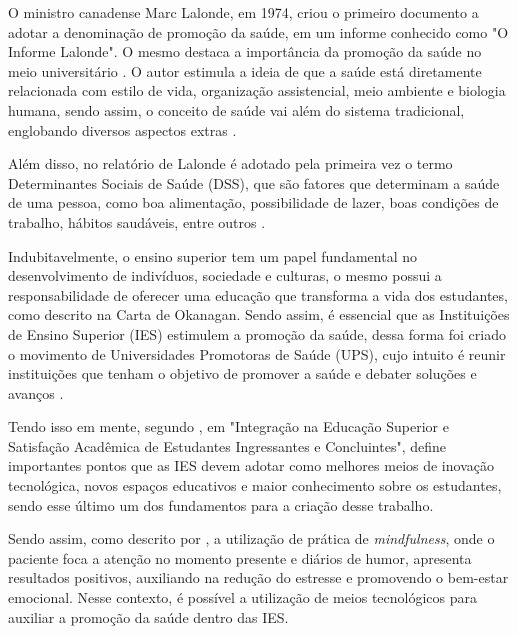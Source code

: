 
O ministro canadense Marc Lalonde, em 1974, criou o primeiro documento a adotar a denominação de promoção da saúde, em um informe conhecido como "O Informe Lalonde". O mesmo destaca a importância da promoção da saúde no meio universitário \cite{rebraups2022}. O autor estimula a ideia de que a saúde está diretamente relacionada com estilo de vida, organização assistencial, meio ambiente e biologia humana, sendo assim, o conceito de saúde vai além do sistema tradicional, englobando diversos aspectos extras \cite{rezende_promocao_2022}.

Além disso, no relatório de Lalonde é adotado pela primeira vez o termo Determinantes Sociais de Saúde (DSS), que são fatores que determinam a saúde de uma pessoa, como boa alimentação, possibilidade de lazer, boas condições de trabalho, hábitos saudáveis, entre outros \cite{heidmann_promocao_2006}. 

Indubitavelmente, o ensino superior tem um papel fundamental no desenvolvimento de indivíduos, sociedade e culturas, o mesmo possui a responsabilidade de oferecer uma educação que transforma a vida dos estudantes, como descrito na Carta de Okanagan. Sendo assim, é essencial que as Instituições de Ensino Superior (IES) estimulem a promoção da saúde, dessa forma foi criado o movimento de Universidades Promotoras de Saúde (UPS), cujo intuito é reunir instituições que tenham o objetivo de promover a saúde e debater soluções e avanços \cite{rezende_promocao_2022}. 

Tendo isso em mente, segundo \cite{schleich_integracao_nodate}, em "Integração na Educação Superior e Satisfação Acadêmica de Estudantes Ingressantes e Concluintes", define importantes pontos que as IES devem adotar como melhores meios de inovação tecnológica, novos espaços educativos e maior conhecimento sobre os estudantes, sendo esse último um dos fundamentos para a criação desse trabalho.

Sendo assim, como descrito por , a utilização de prática de \textit{mindfulness}, onde o paciente foca a atenção no momento presente e diários de humor, apresenta resultados positivos, auxiliando na redução do estresse e promovendo o bem-estar emocional. Nesse contexto, é possível a utilização de meios tecnológicos para auxiliar a promoção da saúde dentro das IES.

